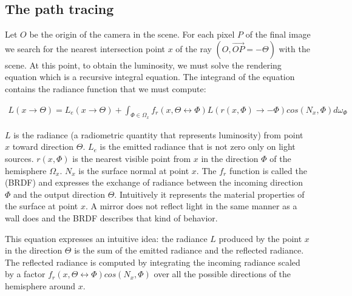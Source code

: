 %
%

\subsection{The path tracing}

Let $O$ be the origin of the camera in the scene. For each pixel $P$ of the final image we search for the nearest intersection point $x$ of the ray $(O, \overrightarrow{OP} = -\Theta)$ with the scene. At this point, to obtain the luminosity, we must solve the rendering equation \cite{Ka86} which is a recursive integral equation. The integrand of the equation contains the radiance function that we must compute:

\begin{align*}
L(x \rightarrow \Theta) = L_e(x \rightarrow \Theta) + \int_{\Phi \in \Omega_x} f_r(x, \Theta \leftrightarrow \Phi) L(r(x, \Phi) \rightarrow -\Phi) cos(N_x, \Phi) d\omega_\Phi
\end{align*}

$L$ is the radiance (a radiometric quantity that represents luminosity) from point $x$ toward direction $\Theta$. $L_e$ is the emitted radiance that is not zero only on light sources. $r(x, \Phi)$ is the nearest visible point from $x$ in the direction $\Phi$ of the hemisphere $\Omega_x$. $N_x$ is the surface normal at point $x$. The $f_r$ function is called the  (BRDF) and expresses the exchange of radiance between the incoming direction $\Phi$ and the output direction $\Theta$. Intuitively it represents the material properties of the surface at point $x$. A mirror does not reflect light in the same manner as a wall does and the BRDF describes that kind of behavior.

This equation expresses an intuitive idea: the radiance $L$ produced by the point $x$ in the direction $\Theta$ is the sum of the emitted radiance and the reflected radiance.  The reflected radiance is computed by integrating the incoming radiance scaled by a factor $f_r(x, \Theta \leftrightarrow \Phi) cos(N_x, \Phi)$ over all the possible directions of the hemisphere around $x$.

